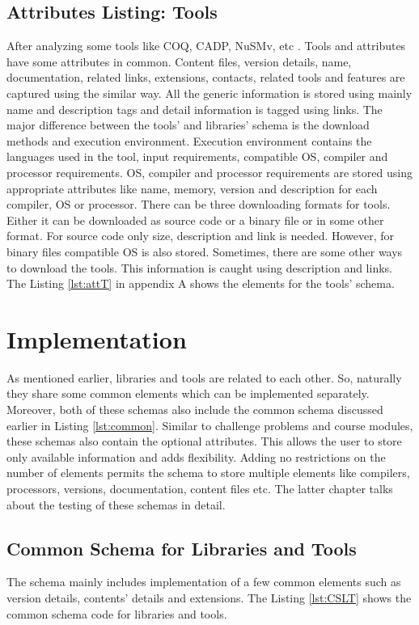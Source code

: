 \documentclass[11pt,letterpaper]{report}
\begin{document}
\subsection*{Attributes Listing: Tools}
After analyzing some tools like COQ, CADP, NuSMv, etc \cite{COQ,CADP,NUSMV}. Tools and attributes have some attributes in common. Content files, version details, name, documentation, related links, extensions, contacts, related tools and features are captured using the similar way. All the generic information is stored using mainly name and description tags and detail information is tagged using links. The major difference between the tools' and libraries' schema is the download methods and execution environment. Execution environment contains the languages used in the tool, input requirements, compatible OS, compiler and processor requirements. OS, compiler and processor requirements are stored using appropriate attributes like name, memory, version and description for each compiler, OS or processor. There can be three downloading formats for tools. Either it can be downloaded as source code or a binary file or in some other format. For source code only size, description and link is needed. However, for binary files compatible OS is also stored. Sometimes, there are some other ways to download the tools. This information is caught using description and links. The Listing \ref{lst:attT} in appendix A shows the elements for the tools' schema.
 
\section*{Implementation}
As mentioned earlier, libraries and tools are related to each other. So, naturally they share some common elements which can be implemented separately. Moreover, both of these schemas also include the common schema discussed earlier in Listing \ref{lst:common}. Similar to challenge problems and course modules, these schemas also contain the optional attributes. This allows the user to store only available information and adds flexibility. Adding no restrictions on the number of elements permits the schema to store multiple elements like compilers, processors, versions, documentation, content files etc. The latter chapter talks about the testing of these schemas in detail. 
\subsection*{Common Schema for Libraries and Tools}
The schema mainly includes implementation of a few common elements such as version details, contents' details and extensions. The Listing \ref{lst:CSLT} shows the common schema code for libraries and tools.
  
\end{document}
